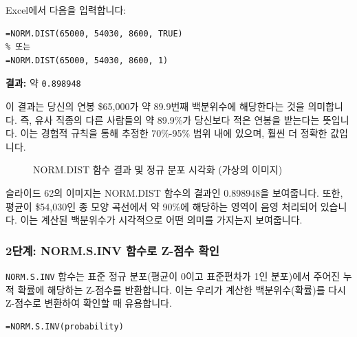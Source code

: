 \documentclass[11pt,a4paper]{book}
\theoremstyle{definition}
\begin{document}
\begin{examplebox}[title=NORM.DIST 함수 적용]
Excel에서 다음을 입력합니다:
\begin{lstlisting}[language=Excel, caption={NORM.DIST 함수를 이용한 백분위수 계산}, label={lst:norm_dist_example}]
=NORM.DIST(65000, 54030, 8600, TRUE)
% 또는
=NORM.DIST(65000, 54030, 8600, 1)
\end{lstlisting}
\textbf{결과:} 약 \texttt{0.898948}

이 결과는 당신의 연봉 \$65,000가 약 89.9번째 백분위수에 해당한다는 것을 의미합니다. 즉, 유사 직종의 다른 사람들의 약 89.9\%가 당신보다 적은 연봉을 받는다는 뜻입니다. 이는 경험적 규칙을 통해 추정한 70\%-95\% 범위 내에 있으며, 훨씬 더 정확한 값입니다.

\begin{figure}[h!]
    \centering
    \caption{NORM.DIST 함수 결과 및 정규 분포 시각화 (가상의 이미지)}
    \label{fig:norm_dist_output}
\end{figure}
\begin{infobox}[title=가상의 이미지 설명: NORM.DIST 함수 결과]
슬라이드 62의 이미지는 NORM.DIST 함수의 결과인 0.898948을 보여줍니다. 또한, 평균이 \$54,030인 종 모양 곡선에서 약 90\%에 해당하는 영역이 음영 처리되어 있습니다. 이는 계산된 백분위수가 시각적으로 어떤 의미를 가지는지 보여줍니다.
\end{infobox}
\end{examplebox}

\subsubsection*{2단계: NORM.S.INV 함수로 Z-점수 확인}

\texttt{NORM.S.INV} 함수는 표준 정규 분포(평균이 0이고 표준편차가 1인 분포)에서 주어진 누적 확률에 해당하는 Z-점수를 반환합니다. 이는 우리가 계산한 백분위수(확률)를 다시 Z-점수로 변환하여 확인할 때 유용합니다.

\begin{lstlisting}[caption={NORM.S.INV 함수 사용법}, label={lst:norm_s_inv}]
=NORM.S.INV(probability)
\end{lstlisting}
\end{document}
